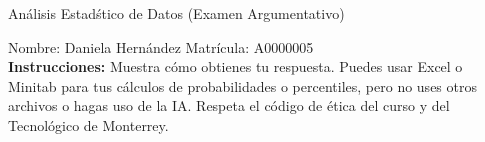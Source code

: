 \documentclass[8pt]{report}
\begin{document}
\newpage



\begin{center}
{An\'alisis Estad\'stico de Datos (Examen Argumentativo)}
\end{center}

Nombre: \underline{\hspace*{.2in}}
Daniela Hernández
\underline{\hspace*{.2in}} \quad Matr\'icula:\underline{\hspace*{.2in}}
A0000005
\underline{\hspace*{.2in}} \\

{\bf Instrucciones:} Muestra c\'omo obtienes tu respuesta. Puedes usar Excel 
o Minitab para tus cálculos de probabilidades o 
percentiles, pero no uses otros archivos o hagas uso de la IA. Respeta el 
c\'odigo de \'etica del curso y del Tecnol\'ogico 
de Monterrey.
\end{document}
